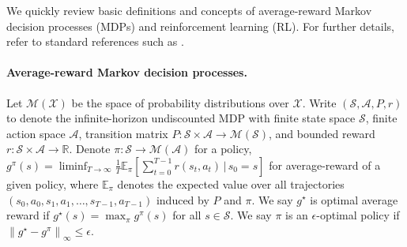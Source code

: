 \documentclass{article} %
\DeclareMathOperator*{\argmax}{arg\,max}
\newcommand{\cA}{\mathcal{A}}
\newcommand{\cS}{\mathcal{S}}
\newcommand{\cM}{\mathcal{M}}
\newcommand{\cX}{\mathcal{X}}
\newcommand{\expec}{\mathbb{E}}
\newcommand{\real}{\mathbb{R}}
\newcommand*{\infn}[1]{\left\|{#1}\right\|_{\infty}}
\begin{document}
We quickly review basic definitions and concepts of average-reward Markov decision processes (MDPs) and reinforcement learning (RL). For further details, refer to standard references such as \citet{10.5555/528623, bertsekas2015dynamic, sutton2018reinforcement}. 


\paragraph{Average-reward Markov decision processes.}
Let $\cM(\cX)$ be the space of probability distributions over $\cX$. Write $(\cS, \cA, P, r)$ to denote the infinite-horizon undiscounted MDP with finite state space $\cS$, finite action space $\cA$, transition matrix $P\colon \cS \times \cA \rightarrow \cM(\cS)$, and bounded reward $r\colon  \cS \times \cA \rightarrow \real$. Denote $\pi\colon \cS \rightarrow \cM(\cA)$ for a policy, $g^{\pi}(s)=\liminf_{T\rightarrow \infty} \frac{1}{T}\expec_{\pi}\left[\sum^{T-1}_{t=0}  r(s_t, a_t) \,|\, s_0=s\right]$  for average-reward of a given policy,  where $\expec_{\pi}$ denotes the expected value over all trajectories $(s_0, a_0, s_1, a_1, \dots, s_{T-1}, a_{T-1})$ induced by $P$ and $\pi$. We say $g^{\star}$ is optimal average reward if $g^{\star}(s)=\max_{\pi}g^{\pi}(s)$ for all $s \in \cS$. We say $\pi$ is an $\epsilon$-optimal policy if $\infn{g^{\star}-g^{\pi}} \le \epsilon$.




\end{document}
